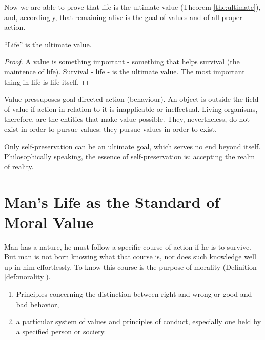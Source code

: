        Now we are able to prove that life is the ultimate value (Theorem \ref{the:ultimate}), and, accordingly, that remaining alive is the goal of values and of all proper action.

            \begin{theorem}
            \label{the:ultimate}
                ``Life'' is the ultimate value.
            \end{theorem}

            \begin{proof}
                A value is something important - something that helps survival (the maintence of life). Survival - life - is the ultimate value. The most important thing in life is life itself.
            \end{proof}

        Value pressuposes goal-directed action (behaviour). An object is outside the field of value if action in relation to it is inapplicable or ineffectual. Living organisms, therefore, are the entities that make value possible. They, nevertheless, do not exist in order to pursue values: they pursue values in order to exist.

        Only self-preservation can be an ultimate goal, which serves no end beyond itself. Philosophically speaking, the essence of self-preservation is: accepting the realm of reality.

    \section{Man's Life as the Standard of Moral Value}

       Man has a nature, he must follow a specific course of action if he is to survive. But man is not born knowing what that course is, nor does such knowledge well up in him effortlessly. To know this course is the purpose of morality (Definition \ref{def:morality}).

            \begin{definition}[Morality]
            \label{def:morality}
                \begin{enumerate}
                    \item Principles concerning the distinction between right and wrong or good and bad behavior,
                    \item a particular system of values and principles of conduct, especially one held by a specified person or society.
                \end{enumerate}
            \end{definition}

